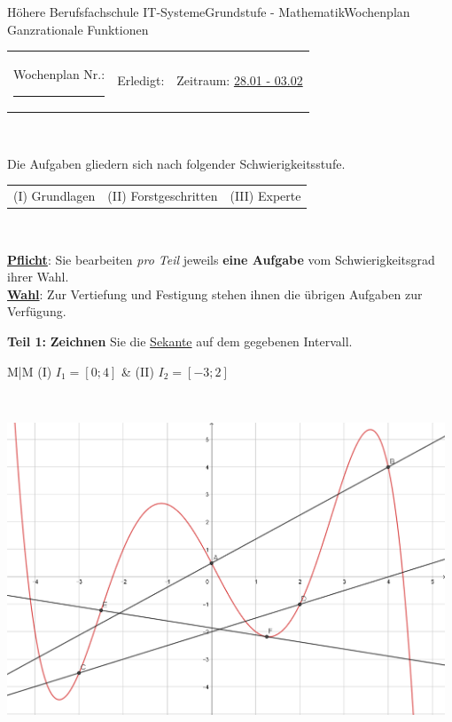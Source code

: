 \documentclass[oneside,openany,headings=optiontotoc,11pt,numbers=noenddot]{scrreprt}
\begin{document}
	\begin{worksheet}{Höhere Berufsfachschule IT-Systeme}{Grundstufe - Mathematik}{Wochenplan Ganzrationale Funktionen}
		\noindent
		\begin{tabularx}{\textwidth}{XXl}
			Wochenplan Nr.: \rule{0.15\textwidth}{1pt} & Erledigt: & Zeitraum: \underline{28.01 - 03.02}
		\end{tabularx}\\
		\par\noindent
		Die Aufgaben gliedern sich nach folgender Schwierigkeitsstufe.\\
		\begin{tabularx}{\textwidth}{XXX}
			(I) Grundlagen & (II) Forstgeschritten & (III) Experte
		\end{tabularx}\\
		\par\noindent
		\textbf{\underline{Pflicht}}: Sie bearbeiten \textit{pro Teil} jeweils \textbf{eine Aufgabe} vom Schwierigkeitsgrad ihrer Wahl.\\
		\underline{\textbf{Wahl}}: Zur Vertiefung und Festigung stehen ihnen die übrigen Aufgaben zur Verfügung.
		\begin{framed}
			\noindent
			\textbf{Teil 1:} \textbf{Zeichnen} Sie die \underline{Sekante} auf dem gegebenen Intervall.\\
			\par\noindent
			\renewcommand{\arraystretch}{1.5}
			\begin{tabularx}{\textwidth}{M|M}
				(I) \(I_1 = [0;4]\) & (II) \(I_2 = [-3;2]\)\\
				\hline
			\end{tabularx}\\
			\renewcommand{\arraystretch}{1}
			\par\bigskip\noindent
			\includegraphics[width=0.98\textwidth]{../99_Bilder/WP/WP12_T1_L.png}

\end{framed}
\end{worksheet}
\end{document}
